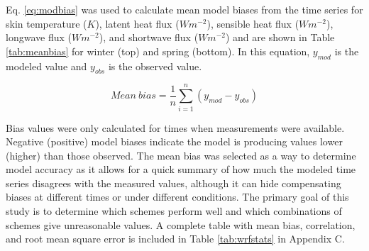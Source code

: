 Eq. \ref{eq:modbias} was used to calculate mean model biases from the time series for skin temperature ($K$), latent heat flux ($Wm^{-2}$), sensible heat flux ($Wm^{-2}$), longwave flux ($Wm^{-2}$), and shortwave flux ($Wm^{-2}$) and are shown in Table \ref{tab:meanbias} for winter (top) and spring (bottom). In this equation, $y_{mod}$ is the modeled value and $y_{obs}$ is the observed value.
 
\begin{equation}\label{eq:modbias}
Mean~bias = \frac{1}{n}\sum^{n}_{i=1}(y_{mod} - y_{obs})
\end{equation}

 Bias values were only calculated for times when measurements were available. Negative (positive) model biases indicate the model is producing values lower (higher) than those observed. The mean bias was selected as a way to determine model accuracy as it allows for a quick summary of how much the modeled time series disagrees with the measured values, although it can hide compensating biases at different times or under different conditions. The primary goal of this study is to determine which schemes perform well and which combinations of schemes give unreasonable values. A complete table with mean bias, correlation, and root mean square error is included in Table \ref{tab:wrfstats} in Appendix C. 

